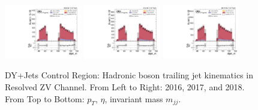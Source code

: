\begin{figure}[!ht]
  \includegraphics[width=0.30\textwidth]{analysis_plots/2016_zjj/cr_vjets_l/dijet_m.pdf}
  \includegraphics[width=0.30\textwidth]{analysis_plots/2017_zjj/cr_vjets_l/dijet_m.pdf}
  \includegraphics[width=0.30\textwidth]{analysis_plots/2018_zjj/cr_vjets_l/dijet_m.pdf} \\
  \caption[DY+Jets Control Region: Hadronic boson trailing jet kinematics in Resolved ZV Channel]%
  {DY+Jets Control Region: Hadronic boson trailing jet kinematics in Resolved ZV Channel. From Left to Right: 2016,
    2017, and 2018. From Top to Bottom: \( p_T \), \( \eta \), invariant mass \( m_{jj} \).}%
  \label{fig:zjj-cr-vjets-l-dijet2-pt-eta-m}
\end{figure}

